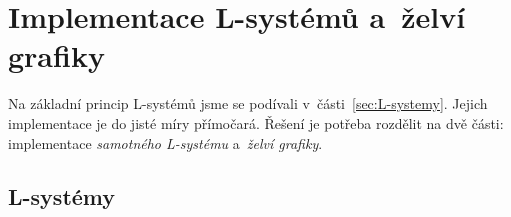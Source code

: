 \section{Implementace L-systémů a~želví grafiky}\label{sec:implementace-lsystemu-a-zelvi-grafiky}

Na základní princip L-systémů jsme se podívali v~části~\ref{sec:L-systemy}. Jejich implementace je do jisté míry přímočará. Řešení je potřeba rozdělit na dvě části: implementace \emph{samotného L-systému} a~\emph{želví grafiky}.

\subsection{L-systémy}\label{subsec:implementace-lsystemu}

